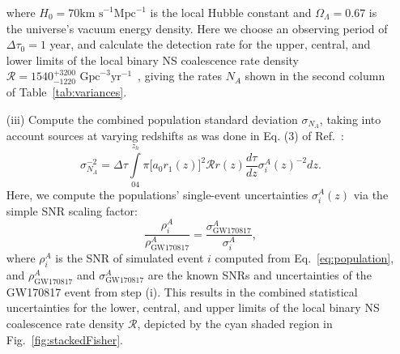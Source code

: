 \documentclass[prd,twocolumn,nofootinbib,superscriptaddress,amsmath,amssymb]{revtex4-1}
\begin{document}
\begin{enumerate}
where $H_0 = 70 \text{km s}^{-1}\text{Mpc}^{-1}$ is the local Hubble constant and $\Omega_{\Lambda}=0.67$ is the universe's vacuum energy density.
Here we choose an observing period of $\Delta \tau_0 = 1$ year, and calculate the detection rate for the upper, central, and lower limits of the local binary NS coalescence rate density $\mathcal{R}=1540^{+3200}_{-1220} \text{ Gpc}^{-3}\text{yr}^{-1}$~\cite{Abbott2017}, giving the rates $N_A$ shown in the second column of Table~\ref{tab:variances}.

\item[(iii)] Compute the combined population standard deviation $\sigma_{N_A}$, taking into account sources at varying redshifts as was done in Eq. (3) of Ref.~\cite{Takahiro}:
\begin{equation}
\sigma_{N_A}^{-2}=\Delta \tau \int\limits^{z_h}_04 \pi \lbrack a_0 r_1(z)\rbrack^2 \mathcal{R}r(z)\frac{d\tau}{dz}\sigma^A_i(z)^{-2}dz.
\end{equation}
Here, we compute the populations' single-event uncertainties $\sigma_i^A(z)$ via the simple SNR scaling factor: 
\begin{equation}
\frac{\rho_i^A}{\rho_{\text{GW170817}}^A} = \frac{\sigma_{\text{GW170817}}^A}{\sigma_i^A},
\end{equation}
where $\rho_i^A$ is the SNR of simulated event $i$ computed from Eq.~\eqref{eq:population}, and $\rho_{\text{GW170817}}^A$ and $\sigma_{\text{GW170817}}^A$ are the known SNRs and uncertainties of the GW170817 event from step (i).
This results in the combined statistical uncertainties for the lower, central, and upper limits of the local binary NS coalescence rate density $\mathcal{R}$, depicted by the cyan shaded region in Fig.~\ref{fig:stackedFisher}.
\end{enumerate}



\end{document}
